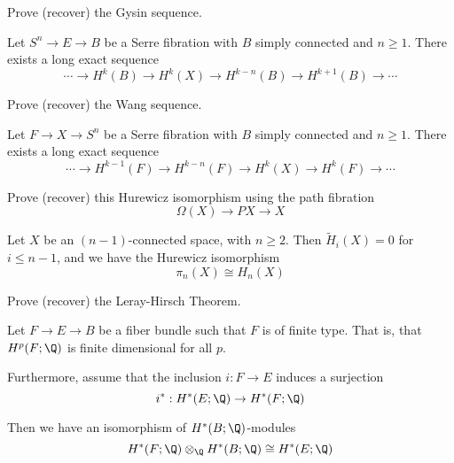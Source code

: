 \begin{xca}
	
	Prove (recover) the Gysin sequence.
	
	\begin{theorem*}
		
		Let $S^n \to E \to B$ be a Serre fibration with $B$ simply connected and $n \geq 1$.  There exists a long exact sequence $$ \cdots \to H^k(B) \to H^k(X) \to H^{k-n}(B) \to H^{k+1}(B) \to \cdots$$
		
	\end{theorem*}
	
	
\end{xca}

\begin{xca}
	Prove (recover) the Wang sequence.
	
	\begin{theorem*}
		
		Let $F \to X \to S^n$ be a Serre fibration with $B$ simply connected and $n \geq 1$.  There exists a long exact sequence $$ \cdots \to H^{k-1}(F) \to H^{k-n}(F) \to H^{k}(X) \to H^{k}(F) \to \cdots$$
		
	\end{theorem*}
	
\end{xca}


\begin{xca}
	
	
	Prove (recover) this Hurewicz isomorphism using the path fibration $$\Omega(X) \to PX \to X$$
	\begin{theorem*}[Hurewicz]
		
		Let $X$ be an $(n-1)$-connected space, with $n \geq 2$.  Then $\tilde{H}_i(X) = 0$ for $i \leq n-1$, and we have the Hurewicz isomorphism $$\pi_n(X) \cong H_n(X)$$
		
	\end{theorem*}
	
\end{xca}

\begin{xca}
	
	Prove (recover) the Leray-Hirsch Theorem.
	
	\begin{theorem*}
		
		Let $F \to E \to B$ be a fiber bundle such that $F$ is of finite type.  That is, that $H^p(F;\Q)$ is finite dimensional for all $p$.
		
		Furthermore, assume that the inclusion $i: F \to E$ induces a surjection $$i^*: H^*(E;\Q) \to H^*(F;\Q)$$
		
		Then we have an isomorphism of $H^*(B;\Q)$-modules $$H^*(F;\Q) \otimes_\Q H^*(B;\Q) \cong H^*(E; \Q)$$
		
	\end{theorem*}
	
\end{xca}

